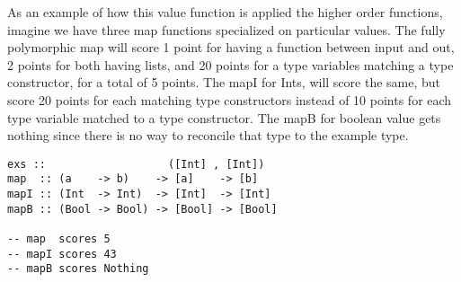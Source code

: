 As an example of how this value function is applied the higher order functions, imagine we have three map functions specialized on particular values. 
The fully polymorphic map will score 1 point for having a function between input and out, 2 points for both having lists, and 20 points for a type variables matching a type constructor, for a total of 5 points. The mapI for Ints, will score the same, but score 20 points for each matching type constructors instead of 10 points for each type variable matched to a type constructor. The mapB for boolean value gets nothing since there is no way to reconcile that type to the example type.

\begin{lstlisting}[caption=Ranking higher order function,label=horank]
exs ::                   ([Int] , [Int])
map  :: (a    -> b)    -> [a]    -> [b]
mapI :: (Int  -> Int)  -> [Int]  -> [Int]
mapB :: (Bool -> Bool) -> [Bool] -> [Bool]

-- map  scores 5
-- mapI scores 43
-- mapB scores Nothing
\end{lstlisting}
